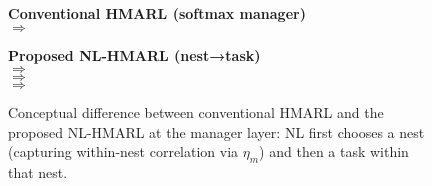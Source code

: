 \documentclass[journal,onecolumn]{IEEEtran}
\begin{document}
\FloatBarrier
\begin{figure}[H]
  \centering
  \renewcommand{\arraystretch}{1.2}
  \begin{minipage}[t]{0.47\textwidth}
    \centering
    \textbf{Conventional HMARL (softmax manager)}\\[4pt]
     $\Rightarrow$ \\
  \end{minipage}\hfill
  \begin{minipage}[t]{0.47\textwidth}
    \centering
    \textbf{Proposed NL-HMARL (nest→task)}\\[4pt]
     $\Rightarrow$ \\
     $\Rightarrow$ \\
     $\Rightarrow$ \\
  \end{minipage}
  \caption{Conceptual difference between conventional HMARL and the proposed NL-HMARL at the manager layer: NL first chooses a nest (capturing within-nest correlation via $\eta_m$) and then a task within that nest.}
  \label{fig:nl_vs_hmarl}
\end{figure}
\FloatBarrier
\end{document}
